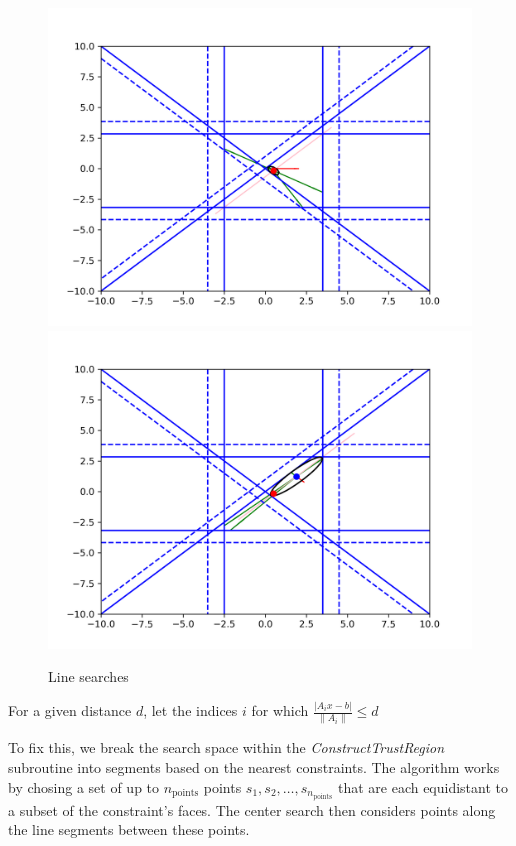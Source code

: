 \begin{figure}[h]
    \centering
    \includegraphics[scale=0.4]{images/line_1.png}
    \includegraphics[scale=0.4]{images/line_2.png}
    \caption{Line searches}
    \label{first_line_search}
\end{figure}


For a given distance $d$, let the indices $i$ for which $\frac {|A_i x - b|}{\|A_i\|} \le d$


To fix this, we break the search space within the \emph{ConstructTrustRegion} subroutine into segments based on the nearest constraints.
The algorithm works by chosing a set of up to $n_{\text{points}}$ points $s_1, s_2, \ldots, s_{n_{\text{points}}}$ that are each equidistant to a subset of the constraint's faces.
The center search then considers points along the line segments between these points.

